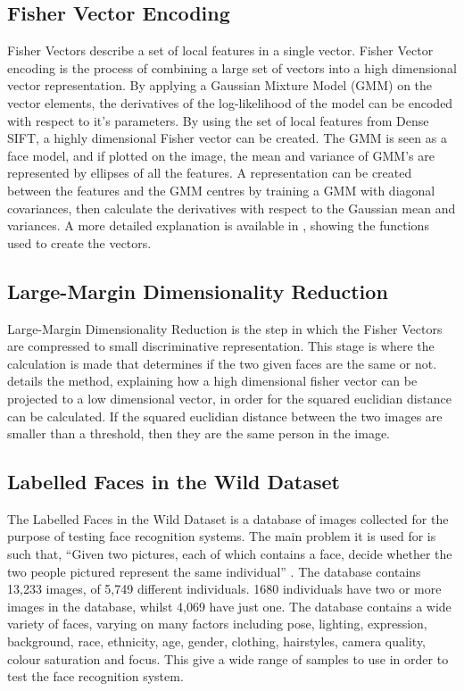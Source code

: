 \documentclass[12pt, a4paper]{article}
\begin{document}
\subsection{Fisher Vector Encoding}
Fisher Vectors describe a set of local features in a single vector. Fisher Vector encoding is the process of combining a large set of vectors into a high dimensional vector representation. By applying a Gaussian Mixture Model (GMM) on the vector elements, the derivatives of the log-likelihood of the model can be encoded with respect to it’s parameters. By using the set of local features from Dense SIFT, a highly dimensional Fisher vector can be created. The GMM is seen as a face model, and if plotted on the image, the mean and variance of GMM’s are represented by ellipses of all the features. A representation can be created between the features and the GMM centres by training a GMM with diagonal covariances, then calculate the derivatives with respect to the Gaussian mean and variances. A more detailed explanation is available in \cite{simonyan2004fisher}, showing the functions used to create the vectors.

\subsection{Large-Margin Dimensionality Reduction}

Large-Margin Dimensionality Reduction is the step in which the Fisher Vectors are compressed to small discriminative representation. This stage is where the calculation is made that determines if the two given faces are the same or not. \cite{simonyan2004fisher} details the method, explaining how a high dimensional fisher vector can be projected to a low dimensional vector, in order for the squared euclidian distance can be calculated. If the squared euclidian distance between the two images are smaller than a threshold, then they are the same person in the image.
        
  \subsection{Labelled Faces in the Wild Dataset}

The Labelled Faces in the Wild Dataset is a database of images collected for the purpose of testing face recognition systems. The main problem it is used for is such that, “Given two pictures, each of which contains a face, decide whether the two people pictured represent the same individual” \cite{labelledFaces}. The database contains 13,233 images, of 5,749 different individuals. 1680 individuals have two or more images in the database, whilst 4,069 have just one. The database contains a wide variety of faces, varying on many factors including pose, lighting, expression, background, race, ethnicity, age, gender, clothing, hairstyles, camera quality, colour saturation and focus. This give a wide range of samples to use in order to test the face recognition system.
\end{document}
